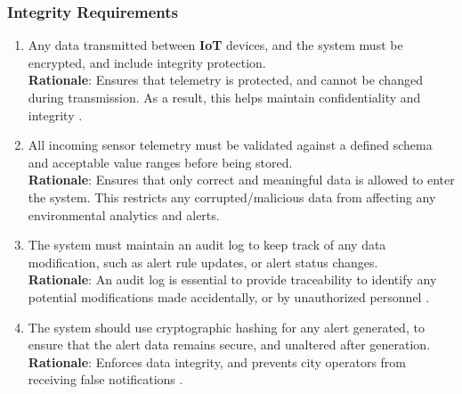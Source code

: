 \documentclass[]{article}
\begin{document}
\subsubsection{Integrity Requirements}
\label{ssub:integrity_requirements}
\begin{enumerate}[{SR-INT}1. ]
    \item Any data transmitted between \textbf{IoT} devices, and the system must be encrypted, and include integrity protection. \\
    \textbf{Rationale}: Ensures that telemetry is protected, and cannot be changed during transmission. As a result, this helps maintain confidentiality and integrity \cite{canEncrypt}.
    
	\item All incoming sensor telemetry must be validated against a defined schema and acceptable value ranges before being stored. \\
    \textbf{Rationale}: Ensures that only correct and meaningful data is allowed to enter the system. This restricts any corrupted/malicious data from affecting any environmental analytics and alerts. 

    \item The system must maintain an audit log to keep track of any data modification, such as alert rule updates, or alert status changes. \\
    \textbf{Rationale}: An audit log is essential to provide traceability to identify any potential modifications made accidentally, or by unauthorized personnel \cite{ali2021}.

    \item The system should use cryptographic hashing for any alert generated, to ensure that the alert data remains secure, and unaltered after generation. \\
    \textbf{Rationale}: Enforces data integrity, and prevents city operators from receiving false notifications \cite{canGuid}.
\end{enumerate}
\end{document}
